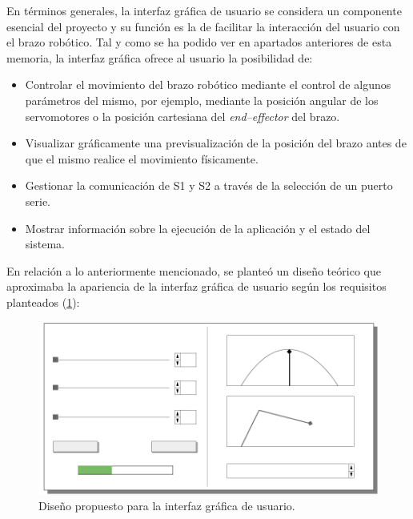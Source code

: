 En términos generales, la interfaz gráfica de usuario se considera un componente esencial del proyecto y su función es la de facilitar la interacción del usuario con el brazo robótico. Tal y como se ha podido ver en apartados anteriores de esta memoria, la interfaz gráfica ofrece al usuario la posibilidad de:
\begin{itemize}
    \item Controlar el movimiento del brazo robótico mediante el control de algunos parámetros del mismo, por ejemplo, mediante la posición angular de los servomotores o la posición cartesiana del \textit{end--effector} del brazo.
    \item Visualizar gráficamente una previsualización de la posición del brazo antes de que el mismo realice el movimiento físicamente.
    \item Gestionar la comunicación de \ac{S1} y \ac{S2} a través de la selección de un puerto serie.
    \item Mostrar información sobre la ejecución de la aplicación y el estado del sistema.
\end{itemize}

En relación a lo anteriormente mencionado, se planteó un diseño teórico que aproximaba la apariencia de la interfaz gráfica de usuario según los requisitos planteados (\ref{fig:ui_design}):

\begin{figure}[H]
    \centering
    \includegraphics[width=0.6\linewidth]{RS/images/InterfaceSketch-MkII.png}
    \caption{Diseño propuesto para la interfaz gráfica de usuario.}
    \label{fig:ui_design}
\end{figure}

